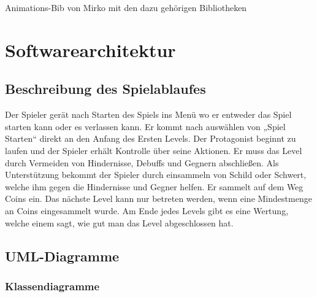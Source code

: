\documentclass{article}
\begin{document}
Animations-Bib von Mirko mit den dazu gehörigen Bibliotheken  



\newpage

\section{Softwarearchitektur}

\vspace{1cm}

\subsection{Beschreibung des Spielablaufes}


Der Spieler gerät nach Starten des Spiels ins Menü wo er entweder das Spiel starten kann oder es
verlassen kann. Er kommt nach auswählen von „Spiel Starten“ direkt an den Anfang des Ersten
Levels. Der Protagonist beginnt zu laufen und der Spieler erhält Kontrolle über seine Aktionen. Er
muss das Level durch Vermeiden von Hindernisse, Debuffs und Gegnern abschließen. Als
Unterstützung bekommt der Spieler durch einsammeln von Schild oder Schwert,
welche ihm gegen die Hindernisse und Gegner helfen. Er sammelt auf dem Weg Coins ein. Das nächste Level kann nur betreten werden, wenn eine Mindestmenge an Coins eingesammelt wurde. Am Ende jedes Levels gibt es eine Wertung, welche einem sagt, wie gut man das Level abgeschlossen hat.\newline

\subsection{UML-Diagramme}

\vspace{1cm}

\subsubsection{Klassendiagramme}
\end{document}
